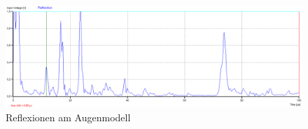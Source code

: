   
  
  
  
    \begin{figure}[h!]
    	\centering
    	\includegraphics[width=\textwidth]{Messung_3.png}
    	\caption{Reflexionen am Augenmodell}
    	\label{fig:reflexion_auge}
    \end{figure}
  
 
 
 
